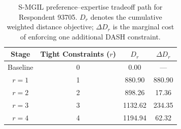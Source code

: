 \begin{table}[htbp]
\centering
\caption{S-MGIL preference--expertise tradeoff path for Respondent 93705. $D_r$ denotes the cumulative weighted distance objective; $\Delta D_r$ is the marginal cost of enforcing one additional DASH constraint.}
\label{tab:tradeoff_path}
\small
\begin{tabular}{cccc}
\toprule
Stage & Tight Constraints ($r$) & $D_r$ & $\Delta D_r$ \\
\midrule
Baseline & 0 & 0.00 & --- \\
$r=1$ & 1 & 880.90 & 880.90 \\
$r=2$ & 2 & 898.26 & 17.36 \\
$r=3$ & 3 & 1132.62 & 234.35 \\
$r=4$ & 4 & 1194.94 & 62.32 \\
\bottomrule
\end{tabular}
\end{table}